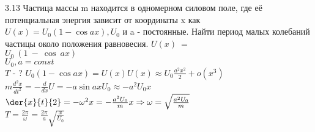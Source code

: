 \testCom
{%
	3.13
}
{%
	Частица массы m находится в одномерном силовом поле, где её потенциальная энергия зависит от координаты x как $U(x)=U_0(1 - \cos ax), U_0$ и a - постоянные. Найти период малых колебаний частицы около положения равновесия.
}
{%
	$U(x)~=$\\
	$U_0~(1~-~\cos~ax)$\\
	$U_0, a = const $\\
}
{%
 	$T$ - ?
}
{%
	${U}_{0}(1 - \cos ax)=U(x)   U(x) \approx U_0 \frac{a^2 x^2}{2} + o(x^3)$\\
	$m \frac{d^2x}{dt^2} = - \frac{d}{dx}U = - a \sin a x U_0 \approx - a^2 U_0 x$\\
	$\der{x}{t}{2} = - \omega^2 x= - \frac{a^2 U_0}{m}x \Rightarrow \omega = \sqrt{\frac{a^2 U_0}{m}}$\\
	$T = \frac{2\pi}{\omega} = \frac{2\pi}{a} \sqrt{\frac{x}{U_0}}$\\
}